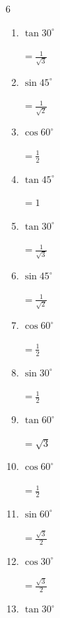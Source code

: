 \begin{multicols}{6}
\begin{enumerate}
        $\displaystyle =\frac{1}{\sqrt{3}}$

  \item $\displaystyle \tan{30^\circ}$

        $\displaystyle =\frac{1}{\sqrt{3}}$

\columnbreak %

  \item $\displaystyle \sin{45^\circ}$

        $\displaystyle =\frac{1}{\sqrt{2}}$

  \item $\displaystyle \cos{60^\circ}$

        $\displaystyle =\frac{1}{2}$

  \item $\displaystyle \tan{45^\circ}$

        $\displaystyle =1$

  \item $\displaystyle \tan{30^\circ}$

        $\displaystyle =\frac{1}{\sqrt{3}}$

  \item $\displaystyle \sin{45^\circ}$

        $\displaystyle =\frac{1}{\sqrt{2}}$

  \item $\displaystyle \cos{60^\circ}$

        $\displaystyle =\frac{1}{2}$

  \item $\displaystyle \sin{30^\circ}$

        $\displaystyle =\frac{1}{2}$

  \item $\displaystyle \tan{60^\circ}$

        $\displaystyle =\sqrt{3}$

  \item $\displaystyle \cos{60^\circ}$

        $\displaystyle =\frac{1}{2}$

  \item $\displaystyle \sin{60^\circ}$

        $\displaystyle =\frac{\sqrt{3}}{2}$

  \item $\displaystyle \cos{30^\circ}$

        $\displaystyle =\frac{\sqrt{3}}{2}$

  \item $\displaystyle \tan{30^\circ}$


\end{enumerate}
\end{multicols}
